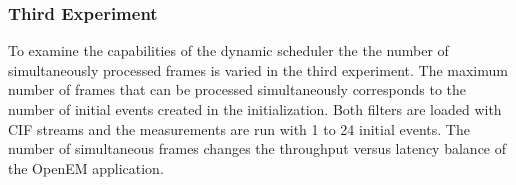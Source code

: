 \subsubsection{Third Experiment}
\label{subsubsec:third-experiment}
To examine the capabilities of the dynamic scheduler the the number of simultaneously processed frames is varied in the third experiment. The maximum number of frames that can be processed simultaneously corresponds to the number of initial events created in the initialization. Both filters are loaded with CIF streams and the measurements are run with 1 to 24 initial events. The number of simultaneous frames changes the throughput versus latency balance of the OpenEM application.
